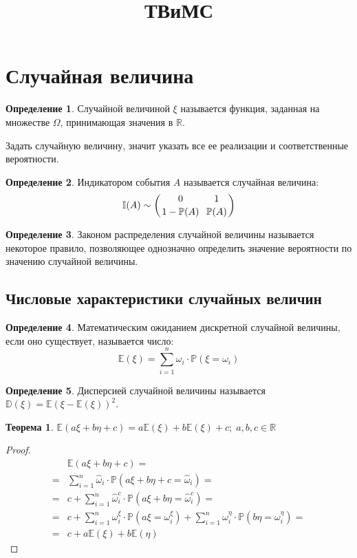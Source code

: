 \documentclass[12pt]{article}
\title{\textbf{ТВиМС}}\date{}\author{}
\theoremstyle{definition}
\newtheorem{theorem}{Теорема}[section]
\newtheorem{definition}{Определение}
\newcommand{\R}{\mathbb{R}}
\newcommand{\I}{\mathbb{I}}
\newcommand{\E}{\mathbb{E}}
\newcommand{\D}{\mathbb{D}}
\newcommand{\prob}{\mathbb{P}}
\begin{document}
\maketitle
\tableofcontents
\label{toc}
\newpage

\section{Случайная величина}

\begin{definition}
    Случайной величиной $\xi$ называется функция, заданная на множестве $\Omega$, принимающая значения в $\R$.
\end{definition}

    Задать случайную величину, значит указать все ее реализации и соответственные вероятности.

\begin{definition}
    Индикатором события $A$ называется случайная величина: $$\I(A)\sim \left(\genfrac{}{}{0pt}{0}{0}{1-\prob(A)}\,\,\, \genfrac{}{}{0pt}{0}{1}{\prob(A)} \right)$$
\end{definition}

\begin{definition}
    Законом распределения случайной величины называется некоторое правило, позволяющее однозначно определить значение вероятности по значению случайной величины.
\end{definition}

    \subsection{Числовые характеристики случайных величин}

\begin{definition}
    Математическим ожиданием дискретной случайной величины, если оно существует, называется число: 
    $$\E (\xi)=\sum_{i=1}^{n}\omega_i\cdot \prob(\xi=\omega_i)$$
\end{definition}

\begin{definition}
    Дисперсией случайной величины называется $\D(\xi)=\E(\xi-\E(\xi))^2$.
\end{definition}

\begin{theorem}
    $\E(a\xi+b\eta+c)=a\E(\xi)+b\E(\xi)+c;\;a,b,c\in \R$
\end{theorem}

\begin{proof}
    \begin{align*}
        &\E(a\xi+b\eta+c)=\\
        =&\sum_{i=1}^n \widehat{\omega}_i\cdot\prob(a\xi+b\eta+c=\widehat{\omega}_i)=\\
        =&c+\sum_{i=1}^n \widehat{\omega}_i^c\cdot\prob(a\xi+b\eta=\widehat{\omega}_i^c)=\\
        =&c+\sum_{i=1}^n \omega_i^\xi\cdot \prob(a\xi=\omega_i^\xi)+\sum_{i=1}^n \omega_i^\eta\cdot\prob(b\eta=\omega_i^\eta)=\\            =&c+a\E(\xi)+b\E(\eta)
    \end{align*}
\end{proof}
\end{document}
